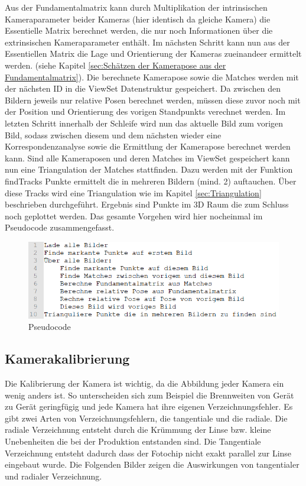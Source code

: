 Aus der Fundamentalmatrix kann durch Multiplikation der intrinsischen Kameraparameter beider Kameras (hier identisch da gleiche Kamera) die Essentielle Matrix berechnet werden, die nur noch Informationen über die extrinsischen Kameraparameter enthält. Im nächsten Schritt kann nun aus der Essentiellen Matrix die Lage und Orientierung der Kameras zueinandeer ermittelt werden. (siehe Kapitel \ref{sec:Schätzen der Kamerapose aus der Fundamentalmatrix}).
Die berechnete Kamerapose sowie die Matches werden mit der nächsten ID in die ViewSet  Datenstruktur gespeichert. Da zwischen den Bildern jeweils nur relative Posen berechnet werden, müssen diese zuvor noch mit der Position und Orientierung des vorigen Standpunkts verechnet werden. 
Im letzten Schritt innerhalb der Schleife wird nun das aktuelle Bild zum vorigen Bild, sodass zwischen diesem und dem nächsten wieder eine Korrespondenzanalyse sowie die Ermittlung der Kamerapose berechnet werden kann.
Sind alle Kameraposen und deren Matches im ViewSet gespeichert kann nun eine Triangulation der Matches stattfinden. Dazu werden mit der Funktion findTracks Punkte ermittelt die in mehreren Bildern (mind. 2) auftauchen. Über diese Tracks wird eine Triangulation wie im Kapitel \ref{sec:Triangulation} beschrieben durchgeführt. Ergebnis sind Punkte im 3D Raum die zum Schluss noch geplottet werden.
Das gesamte Vorgehen wird hier nocheinmal im Pseudocode zusammengefasst.
\begin{figure}[ht]
    \centering
    \includegraphics[scale=0.75]{Figures/Pseudocode.PNG}
    \caption{Pseudocode}
\end{figure}

\subsection{Kamerakalibrierung}
\label{sec:Kamerakalibrierung}
Die Kalibrierung der Kamera ist wichtig, da die Abbildung jeder Kamera ein wenig anders ist. So unterscheiden sich zum Beispiel die Brennweiten von Gerät zu Gerät geringfügig und jede Kamera hat ihre eigenen Verzeichnungsfehler.
Es gibt zwei Arten von Verzeichnungsfehlern, die tangentiale und die radiale. Die radiale Verzeichnung entsteht durch die Krümmung der Linse bzw. kleine Unebenheiten die bei der Produktion entstanden sind. Die Tangentiale Verzeichnung entsteht dadurch dass der Fotochip nicht exakt parallel zur Linse eingebaut wurde. Die Folgenden Bilder zeigen die Auswirkungen von tangentialer und radialer Verzeichnung.\cite{Verlag}


